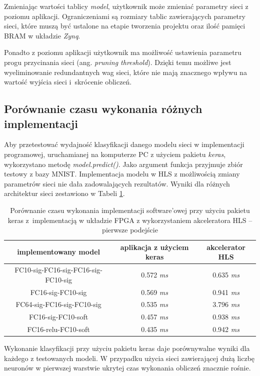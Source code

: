 Zmieniając wartości tablicy \emph{model}, użytkownik może zmieniać parametry sieci z poziomu 
aplikacji. Ograniczeniami są rozmiary tablic zawierających parametry sieci, które muszą być 
ustalone na etapie tworzenia projektu oraz ilość pamięci BRAM w układzie \emph{Zynq}.
   
Ponadto z poziomu aplikacji użytkownik ma możliwość ustawienia parametru progu przycinania sieci 
(ang. \emph{pruning threshold}). Dzięki temu możliwe jest wyeliminowanie redundantnych wag sieci, które nie mają znacznego wpływu na wartość wyjścia sieci i~skrócenie obliczeń.


\subsection{Porównanie czasu wykonania różnych implementacji}

Aby przetestować wydajność klasyfikacji danego modelu sieci w implementacji programowej, uruchamianej na komputerze PC z użyciem pakietu \emph{keras}, wykorzystano metodę \emph{model.predict()}. Jako argument funkcja przyjmuje zbiór testowy z bazy MNIST.
Implementacja modelu w HLS z możliwością zmiany parametrów sieci nie dała zadowalających rezultatów. Wyniki dla różnych architektur sieci zestawiono w Tabeli \ref{tab:czas-wykonania}. 

\begin{table}[h] \centering
  \caption{Porównanie czasu wykonania implementacji software'owej przy użyciu pakietu keras z~implementacją w układzie FPGA z wykorzystaniem akceleratora HLS -- pierwsze podejście}
  \centering
  \begin{tabular} {c|c|c} \hline \label{tab:czas-wykonania}  
    implementowany model & aplikacja z użyciem keras & akcelerator HLS\\ \hline \hline
    FC10-sig-FC16-sig-FC16-sig-FC10-sig & 0.572 \emph{ms} & 0.635 \emph{ms} \\
    FC16-sig-FC10-sig & 0.569 \emph{ms} & 0.941 \emph{ms} \\
    FC64-sig-FC16-sig-FC10-sig & 0.535 \emph{ms} & 3.796 \emph{ms} \\
    FC16-sig-FC10-soft & 0.457 \emph{ms} & 0.938 \emph{ms} \\
    FC16-relu-FC10-soft & 0.435 \emph{ms} & 0.942 \emph{ms} \\
  \end{tabular}
\end{table}

Wykonanie klasyfikacji przy użyciu pakietu keras daje porównywalne wyniki dla każdego z testowanych modeli. W przypadku użycia sieci zawierającej dużą liczbę neuronów w pierwszej warstwie ukrytej czas wykonania obliczeń znacznie rośnie.




